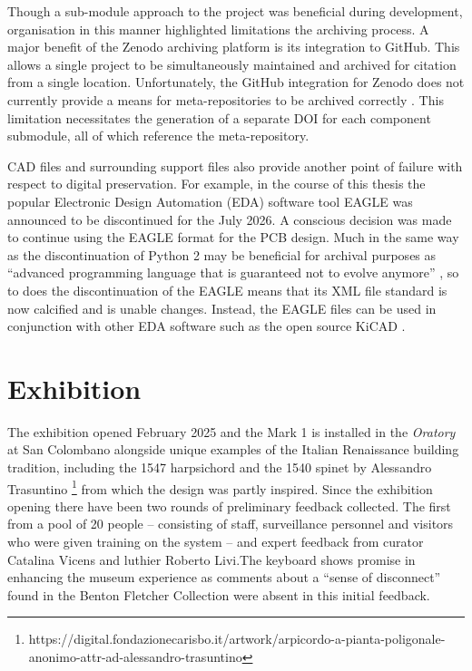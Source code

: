 Though a sub-module approach to the project was beneficial during development, organisation in this manner highlighted limitations the archiving process. A major benefit of the Zenodo archiving platform is its integration to GitHub. This allows a single project to be simultaneously maintained and archived for citation from a single location.
Unfortunately, the GitHub integration for Zenodo does not currently provide a means for meta-repositories to be archived correctly \cite{zenodo_1036_2025}. This limitation necessitates the generation of a separate DOI for each component submodule, all of which reference the meta-repository.

CAD files and surrounding support files also provide another point of failure with respect to digital preservation. For example, in the course of this thesis the popular Electronic Design Automation (EDA) software tool EAGLE was announced to be discontinued \cite{autodesk_eagle_2024} for the July 2026. A conscious decision was made to continue using the EAGLE format for the PCB design. Much in the same way as the discontinuation of Python 2 may be beneficial for archival purposes as ``advanced programming language that is guaranteed not to evolve anymore'' \cite{rougier_loupe_2020}, so to does the discontinuation of the EAGLE means that its XML file standard is now calcified and is unable changes. Instead, the EAGLE files can be used in conjunction with other EDA software such as the open source KiCAD \cite{kicad_eagle_2024}.

\section{Exhibition}\label{interfacing-with-digital-instrument}


The exhibition opened February 2025 and the Mark 1 is installed in the \emph{Oratory} at San Colombano alongside unique examples of the Italian Renaissance building tradition,
including the 1547 harpsichord and the 1540 spinet by Alessandro Trasuntino \footnote{https://digital.fondazionecarisbo.it/artwork/arpicordo-a-pianta-poligonale-anonimo-attr-ad-alessandro-trasuntino} from which the design was partly inspired.
Since the exhibition opening there have been two rounds of preliminary feedback collected. The first from a pool of 20 people -- consisting of staff, surveillance personnel and visitors who were given training on the system -- and expert feedback from curator Catalina Vicens and luthier Roberto Livi.The keyboard shows
promise in enhancing the museum experience as comments about a ``sense of
disconnect'' found in the Benton Fletcher Collection
\cite{mcalpine_sampling_2014} were absent in this initial feedback.


